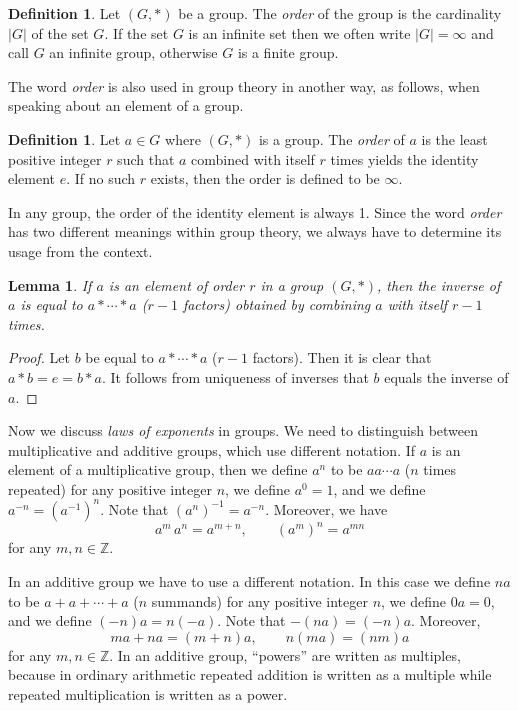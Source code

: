 \documentclass[11pt]{article}
\newtheorem{lem}[thm]{Lemma}
\theoremstyle{definition}
\newtheorem{defn}[thm]{Definition}
\newcommand{\Z}{\mathbb{Z}} %
\begin{document}
\begin{defn}
  Let $(G,*)$ be a group. The {\em order} of the group is the
  cardinality $|G|$ of the set $G$. If the set $G$ is an infinite set
  then we often write $|G| = \infty$ and call $G$ an infinite group,
  otherwise $G$ is a finite group.
\end{defn}

The word \emph{order} is also used in group theory in another way, as
follows, when speaking about an element of a group.

\begin{defn}\label{def:order-elt}
  Let $a \in G$ where $(G,*)$ is a group.  The {\em order} of $a$ is
  the least positive integer $r$ such that $a$ combined with itself
  $r$ times yields the identity element $e$.  If no such $r$ exists,
  then the order is defined to be $\infty$.
\end{defn}

In any group, the order of the identity element is always 1.  Since
the word \emph{order} has two different meanings within group theory,
we always have to determine its usage from the context.

\begin{lem}\label{lem:inverse-if-finite}
  If $a$ is an element of order $r$ in a group $(G,*)$, then the
  inverse of $a$ is equal to $a* \cdots *a$ ($r-1$ factors) obtained
  by combining $a$ with itself $r-1$ times.
\end{lem}

\begin{proof}
  Let $b$ be equal to $a* \cdots *a$ ($r-1$ factors). Then it is clear
  that $a*b = e = b*a$. It follows from uniqueness of inverses that
  $b$ equals the inverse of $a$.
\end{proof}



Now we discuss \emph{laws of exponents} in
groups. We need to distinguish between multiplicative and additive
groups, which use different notation.  If $a$ is an element of a
multiplicative group, then we define $a^n$ to be $aa\cdots a$ ($n$
times repeated) for any positive integer $n$, we define $a^0 = 1$, and
we define $a^{-n} = (a^{-1})^n$.  Note that $(a^n)^{-1} =
a^{-n}$. Moreover, we have
\[
  a^m\,a^n = a^{m+n}, \qquad (a^m)^n = a^{mn}
\]
for any $m,n \in \Z$.

In an additive group we have to use a different notation. In this case we
define $n a$ to be $a+a+\cdots+a$ ($n$ summands) for any positive
integer $n$, we define $0 a = 0$, and we define $(-n) a = n(-a)$. 
Note that $-(na) = (-n)a$.  Moreover, 
\[
  ma + na = (m+n)a, \qquad n(ma) = (nm)a
\]
for any $m,n \in \Z$. In an additive group, ``powers'' are written as
multiples, because in ordinary arithmetic repeated addition is written
as a multiple while repeated multiplication is written as a power.
\end{document}
